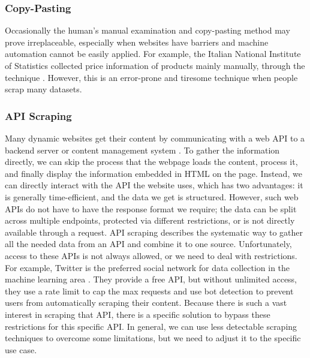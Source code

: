 \subsubsection{Copy-Pasting}\label{subsubsec:copy-pasting}
Occasionally the human’s manual examination and copy-pasting method may prove irreplaceable, especially when websites have barriers and machine automation cannot be easily applied.
For example, the Italian National Institute of Statistics collected price information of products mainly manually, through the  technique \cite{polidoro2015web}.
However, this is an error-prone and tiresome technique when people scrap many datasets.

\subsubsection{API Scraping}
Many dynamic websites get their content by communicating with a web \ac{API} to a backend server or content management system \cite{wilkinson2018accessible}.
To gather the information directly, we can skip the process that the webpage loads the content, process it, and finally display the information embedded in \ac{HTML} on the page.
Instead, we can directly interact with the \ac{API} the website uses, which has two advantages: it is generally time-efficient, and the data we get is structured.
However, such web \ac{API}s do not have to have the response format we require;
the data can be split across multiple endpoints, protected via different restrictions, or is not directly available through a request.
\ac{API} scraping describes the systematic way to gather all the needed data from an \ac{API} and combine it to one source.
Unfortunately, access to these \ac{API}s is not always allowed, or we need to deal with restrictions.
For example, Twitter is the preferred social network for data collection in the machine learning area \cite{sohail2021crawling, sembodo2016data}.
They provide a free API, but without unlimited access, they use a rate limit to cap the max requests and use bot detection to prevent users from automatically scraping their content.
Because there is such a vast interest in scraping that \ac{API}, there is a specific solution to bypass these restrictions for this specific \ac{API}.
In general, we can use less detectable scraping techniques \cite{farholt2021less} to overcome some limitations, but we need to adjust it to the specific use case.


